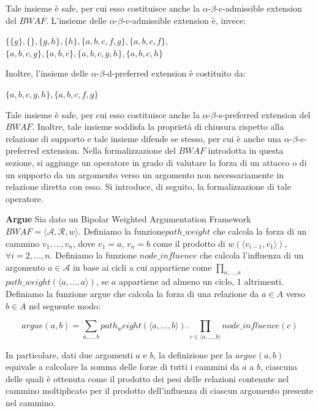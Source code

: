 Tale insieme è safe, per cui esso costituisce anche la $\alpha$-$\beta$-c-admissible extension del $BWAF$. L'insieme delle $\alpha$-$\beta$-c-admissible extension è, invece:

\begin{center}
    $\{\{g\},\{\},\{g,h\},\{h\},\{a,b,c,f,g\},\{a,b,c,f\},$ \\ 
    $\{a,b,c,g\},\{a,b,c\},\{a,b,c,g,h\},\{a,b,c,h\}$
\end{center}

Inoltre, l'insieme delle $\alpha$-$\beta$-d-preferred extension è costituito da:

\begin{center}
    $\{a,b,c,g,h\},\{a,b,c,f,g\}$
\end{center}

Tale insieme è safe, per cui esso costituisce anche la $\alpha$-$\beta$-s-preferred extension del $BWAF$. Inoltre, tale insieme soddisfa la proprietà di chiusura rispetto alla relazione di supporto e tale insieme difende se stesso, per cui è anche una $\alpha$-$\beta$-c-preferred extension.
Nella formalizzazione del $BWAF$ introdotta in questa sezione, si aggiunge un operatore in grado di valutare la forza di un attacco o di un supporto da un argomento verso un argomento non necessariamente in relazione diretta con esso. Si introduce, di seguito, la formalizzazione di tale operatore.

\bigskip
\begin{defn} \textbf{Argue}
Sia dato un Bipolar Weighted Argumentation Framework $BWAF = ⟨\mathcal{A}, \mathcal{R}, w⟩$. Definiamo la funzione$ path\_weight$ che calcola la forza di un cammino $v_1, ... , v_n$, dove $v_1 = a$, $v_n = b$ come il prodotto di $w(⟨v_{i-1},v_1⟩)$, $\forall i = 2,...,n$. Definiamo la funzione $node\_influence$ che calcola l'influenza di un argomento $a \in \mathcal{A}$ in base ai cicli a cui appartiene come $\prod_{a,...,a}$  $path\_weight(⟨a,...,a⟩)$, se $a$ appartiene ad almeno un ciclo, 1 altrimenti. Definiamo la funzione argue che calcola la forza di una relazione da $a \in A$ verso $b \in A$ nel seguente modo:

    \begin{center}
        $$argue(a,b) = \sum_{a,...,b} path_weight(⟨a,...,b⟩). \prod_{c \in ⟨a,...,b⟩} node\_influence(c)$$
    \end{center}

\end{defn}

In particolare, dati due argomenti $a$ e $b$, la definizione per la $argue(a,b)$ equivale a calcolare la somma delle forze di tutti i cammini da $a$ a $b$, ciascuna delle quali è ottenuta  come il prodotto dei pesi delle relazioni contenute nel cammino moltiplicato per il prodotto dell'influenza di ciascun argomento presente nel cammino. 

